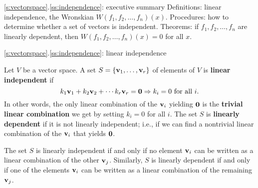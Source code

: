 \begin{frame}{\ref{s:vectorspace}.\ref{ss:independence}: executive summary}
\alert{Definitions:} linear independence, the Wronskian $W(f_1,f_2,\dots,f_n)(x)$.
\bspace
\alert{Procedures:} how to determine whether a set of vectors is independent.
\bspace
\alert{Theorems:} if $f_1,f_2,\dots, f_n$ are linearly dependent, then $W(f_1,f_2,\dots,f_n)(x)=0$ for all $x$.   
\end{frame}
\begin{frame}{\ref{s:vectorspace}.\ref{ss:independence}: linear independence}
\footnotesize
\begin{definition}
Let $V$ be a vector space. A set $S=\{{\mathbf v}_1,\dots ,{\mathbf v}_r\}$ of elements of $V$ is {\bf linear independent} if 
\[
k_1{\mathbf v}_1+k_2{\mathbf v}_2+\cdots k_r{\mathbf v}_r={\mathbf 0} \Rightarrow k_i=0 \text{ for all $i$}.
\]
\pause In other words, the only linear combination of the ${\mathbf v}_i$ yielding ${\mathbf 0}$ is the {\bf trivial linear combination} we get by setting $k_i=0$ for all $i$. 
\bpause
The set $S$ is {\bf linearly dependent} if it is not linearly independent; i.e., if we can find a nontrivial linear combination of the ${\mathbf v}_i$ that yields ${\mathbf 0}$.  
\end{definition}
\pause
\begin{theorem}
The set $S$ is linearly independent if and only if no element ${\mathbf v}_i$ can be written as a linear combination of the other ${\mathbf v}_j$. 
\bspace 
Similarly, $S$ is linearly dependent if and only if one of the elements ${\mathbf v}_i$ can be written as a linear combination of the remaining ${\mathbf v}_j$. 
\end{theorem}  
\pause
\begin{comment} Sometimes in the literature the statement in the theorem is taken to be the definition of linear dependence: i.e., that one vector can be written as a linear combination of the others. I prefer my definition, which leads to a straightforward procedure for determining linear independence. 
\end{comment}
\end{frame}
